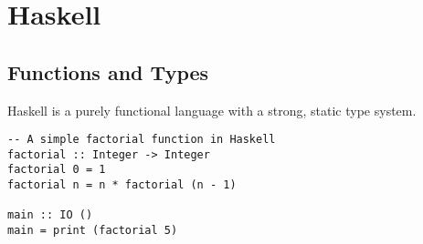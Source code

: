 
\section{Haskell}

\lipsum[3] %

\subsection{Functions and Types}
Haskell is a purely functional language with a strong, static type system.
\begin{lstlisting}[style=haskellstyle]
-- A simple factorial function in Haskell
factorial :: Integer -> Integer
factorial 0 = 1
factorial n = n * factorial (n - 1)

main :: IO ()
main = print (factorial 5)
\end{lstlisting}

\lipsum[4]


